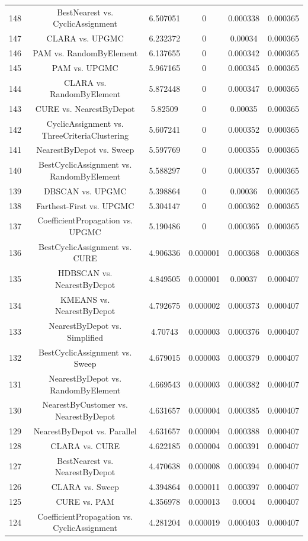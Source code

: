 \documentclass[a4paper,10pt]{article}
\begin{document}
\begin{landscape}
\begin{table}[!htp]
\begin{tabular}{cccccc}
148&BestNearest vs. CyclicAssignment&6.507051&0&0.000338&0.000365\\
147&CLARA vs. UPGMC&6.232372&0&0.00034&0.000365\\
146&PAM vs. RandomByElement&6.137655&0&0.000342&0.000365\\
145&PAM vs. UPGMC&5.967165&0&0.000345&0.000365\\
144&CLARA vs. RandomByElement&5.872448&0&0.000347&0.000365\\
143&CURE vs. NearestByDepot&5.82509&0&0.00035&0.000365\\
142&CyclicAssignment vs. ThreeCriteriaClustering&5.607241&0&0.000352&0.000365\\
141&NearestByDepot vs. Sweep&5.597769&0&0.000355&0.000365\\
140&BestCyclicAssignment vs. RandomByElement&5.588297&0&0.000357&0.000365\\
139&DBSCAN vs. UPGMC&5.398864&0&0.00036&0.000365\\
138&Farthest-First vs. UPGMC&5.304147&0&0.000362&0.000365\\
137&CoefficientPropagation vs. UPGMC&5.190486&0&0.000365&0.000365\\
136&BestCyclicAssignment vs. CURE&4.906336&0.000001&0.000368&0.000368\\
135&HDBSCAN vs. NearestByDepot&4.849505&0.000001&0.00037&0.000407\\
134&KMEANS vs. NearestByDepot&4.792675&0.000002&0.000373&0.000407\\
133&NearestByDepot vs. Simplified&4.70743&0.000003&0.000376&0.000407\\
132&BestCyclicAssignment vs. Sweep&4.679015&0.000003&0.000379&0.000407\\
131&NearestByDepot vs. RandomByElement&4.669543&0.000003&0.000382&0.000407\\
130&NearestByCustomer vs. NearestByDepot&4.631657&0.000004&0.000385&0.000407\\
129&NearestByDepot vs. Parallel&4.631657&0.000004&0.000388&0.000407\\
128&CLARA vs. CURE&4.622185&0.000004&0.000391&0.000407\\
127&BestNearest vs. NearestByDepot&4.470638&0.000008&0.000394&0.000407\\
126&CLARA vs. Sweep&4.394864&0.000011&0.000397&0.000407\\
125&CURE vs. PAM&4.356978&0.000013&0.0004&0.000407\\
124&CoefficientPropagation vs. CyclicAssignment&4.281204&0.000019&0.000403&0.000407\\

\end{tabular}
\end{table}
\end{landscape}
\end{document}
